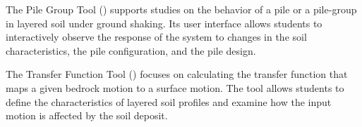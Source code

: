 \noindent The Pile Group Tool () supports studies on the behavior of a pile or a pile-group in layered soil under ground shaking. Its user interface allows students to interactively observe the response of the system to changes in the soil characteristics, the pile configuration, and the pile design.

\noindent The Transfer Function Tool () focuses on calculating the transfer function that maps a given bedrock motion to a surface motion. The tool allows students to define the characteristics of layered soil profiles and examine how the input motion is affected by the soil deposit.

